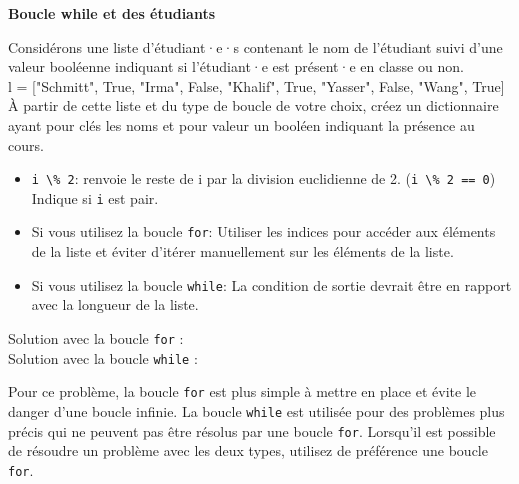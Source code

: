     
    \begin{Exercice}[10 minutes] \textbf{Boucle while et des étudiants}
      	
      	Considérons une liste d'étudiant·e·s contenant le nom de l'étudiant suivi d'une valeur booléenne indiquant si l'étudiant·e est présent·e en classe ou non. \\
      	
      	l = ["Schmitt", True, "Irma", False, "Khalif", True, "Yasser", False, "Wang", True] \\
      	
      	À partir de cette liste et du type de boucle de votre choix, créez un dictionnaire ayant pour clés les noms et pour valeur un booléen indiquant la présence au cours.
    
        \begin{conseil}
           \begin{itemize}
           		\item \lstinline{i \% 2}: renvoie le reste de i par la division euclidienne de 2. (\lstinline{i \% 2 == 0}) Indique si \lstinline{i} est pair.
           	\item Si vous utilisez la boucle \lstinline{for}: Utiliser les indices pour accéder aux éléments de la liste et éviter d'itérer manuellement sur les éléments de la liste.
           	\item Si vous utilisez la boucle \lstinline{while}: La condition de sortie devrait être en rapport avec la longueur de la liste.
           \end{itemize}
		     
        \end{conseil}
        
        \begin{solution}
        	Solution avec la boucle \lstinline{for} : \\
        
            
            
            Solution avec la boucle \lstinline{while} :
            
            
            
            
            Pour ce problème, la boucle \lstinline{for} est plus simple à mettre en place et évite le danger d'une boucle infinie. La boucle \lstinline{while} est utilisée pour des problèmes plus précis qui ne peuvent pas être résolus par une boucle \lstinline{for}. Lorsqu'il est possible de résoudre un problème avec les deux types, utilisez de préférence une boucle \lstinline{for}.
            
        \end{solution}
    \end{Exercice}
    
